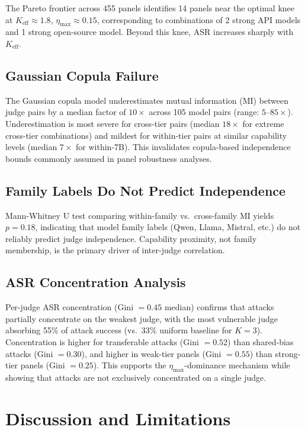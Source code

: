 \documentclass[11pt,a4paper]{article}
\newcommand{\keff}{K_{\text{eff}}}
\newcommand{\etamax}{\eta_{\max}}
\begin{document}
The Pareto frontier across 455 panels identifies 14 panels near the optimal knee at $\keff \approx 1.8$, $\etamax \approx 0.15$, corresponding to combinations of 2 strong API models and 1 strong open-source model. Beyond this knee, ASR increases sharply with $\keff$.

\subsection{Gaussian Copula Failure}

The Gaussian copula model underestimates mutual information (MI) between judge pairs by a median factor of $10\times$ across 105 model pairs (range: $5$--$85\times$). Underestimation is most severe for cross-tier pairs (median $18\times$ for extreme cross-tier combinations) and mildest for within-tier pairs at similar capability levels (median $7\times$ for within-7B). This invalidates copula-based independence bounds commonly assumed in panel robustness analyses.

\subsection{Family Labels Do Not Predict Independence}

Mann-Whitney U test comparing within-family vs.\ cross-family MI yields $p = 0.18$, indicating that model family labels (Qwen, Llama, Mistral, etc.) do not reliably predict judge independence. Capability proximity, not family membership, is the primary driver of inter-judge correlation.

\subsection{ASR Concentration Analysis}

Per-judge ASR concentration (Gini $= 0.45$ median) confirms that attacks partially concentrate on the weakest judge, with the most vulnerable judge absorbing 55\% of attack success (vs.\ 33\% uniform baseline for $K=3$). Concentration is higher for transferable attacks (Gini $= 0.52$) than shared-bias attacks (Gini $= 0.30$), and higher in weak-tier panels (Gini $= 0.55$) than strong-tier panels (Gini $= 0.25$). This supports the $\etamax$-dominance mechanism while showing that attacks are not exclusively concentrated on a single judge.

\section{Discussion and Limitations}
\end{document}
